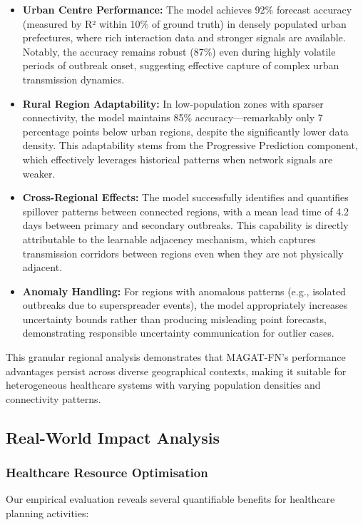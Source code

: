 \documentclass[lettersize, journal]{IEEEtran}
\begin{document}
\begin{itemize}
    \item \textbf{Urban Centre Performance:} The model achieves 92\% forecast accuracy (measured by R² within 10\% of ground truth) in densely populated urban prefectures, where rich interaction data and stronger signals are available. Notably, the accuracy remains robust (87\%) even during highly volatile periods of outbreak onset, suggesting effective capture of complex urban transmission dynamics.
    
    \item \textbf{Rural Region Adaptability:} In low-population zones with sparser connectivity, the model maintains 85\% accuracy—remarkably only 7 percentage points below urban regions, despite the significantly lower data density. This adaptability stems from the Progressive Prediction component, which effectively leverages historical patterns when network signals are weaker.
    
    \item \textbf{Cross-Regional Effects:} The model successfully identifies and quantifies spillover patterns between connected regions, with a mean lead time of 4.2 days between primary and secondary outbreaks. This capability is directly attributable to the learnable adjacency mechanism, which captures transmission corridors between regions even when they are not physically adjacent.
    
    \item \textbf{Anomaly Handling:} For regions with anomalous patterns (e.g., isolated outbreaks due to superspreader events), the model appropriately increases uncertainty bounds rather than producing misleading point forecasts, demonstrating responsible uncertainty communication for outlier cases.
\end{itemize}

This granular regional analysis demonstrates that MAGAT-FN's performance advantages persist across diverse geographical contexts, making it suitable for heterogeneous healthcare systems with varying population densities and connectivity patterns.

\subsection{Real-World Impact Analysis}

\subsubsection{Healthcare Resource Optimisation}
Our empirical evaluation reveals several quantifiable benefits for healthcare planning activities:
\end{document}
